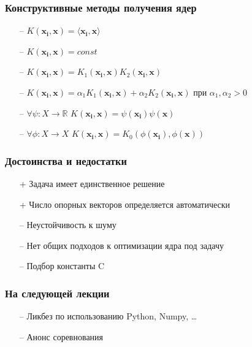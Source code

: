 \documentclass[12pt]{beamer}
\begin{document}
\begin{frame}\frametitle{Конструктивные методы получения ядер}
\begin{itemize}
\item[--] $K(\mathbf{x_i}, \mathbf{x}) = \langle \mathbf{x_i}, \mathbf{x} \rangle$
\item[--] $K(\mathbf{x_i}, \mathbf{x}) = const$
\item[--] $K(\mathbf{x_i}, \mathbf{x}) = K_1(\mathbf{x_i}, \mathbf{x}) K_2(\mathbf{x_i}, \mathbf{x})$
\item[--] $K(\mathbf{x_i}, \mathbf{x}) = \alpha_1 K_1(\mathbf{x_i}, \mathbf{x}) + \alpha_2 K_2(\mathbf{x_i}, \mathbf{x})$ при  $\alpha_1, \alpha_2 > 0$
\item[--] $\forall \psi: X \rightarrow \mathbb{R}$ \hspace{5mm}$K(\mathbf{x_i}, \mathbf{x}) = \psi(\mathbf{x_i}) \psi(\mathbf{x})$
\item[--] $\forall \phi: X \rightarrow X$ \hspace{5mm}$K(\mathbf{x_i}, \mathbf{x}) = K_0(\phi(\mathbf{x_i}),  \phi(\mathbf{x}))$
\end{itemize}
\end{frame}

\begin{frame}\frametitle{Достоинства и недостатки}
\begin{itemize}
\item[+] Задача имеет единственное решение
\item[+] Число опорных векторов определяется автоматически
\end{itemize}
\begin{itemize}
\item[--] Неустойчивость к шуму
\item[--] Нет общих подходов к оптимизации ядра под задачу
\item[--] Подбор константы C
\end{itemize}
\end{frame}

\begin{frame}\frametitle{На следующей лекции}

\begin{itemize}
\item[--] Ликбез по использованию Python, Numpy, \dots
\item[--] Анонс соревнования
\end{itemize}
\end{frame}
\end{document}
